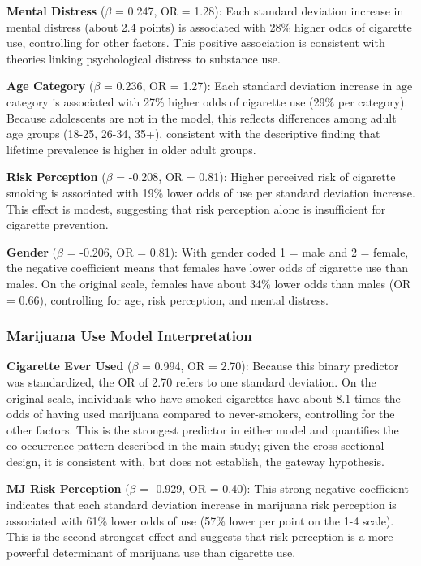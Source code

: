 \documentclass[conference]{IEEEtran}
\begin{document}
\textbf{Mental Distress} ($\beta$ = 0.247, OR = 1.28): Each standard deviation increase in mental distress (about 2.4 points) is associated with 28\% higher odds of cigarette use, controlling for other factors. This positive association is consistent with theories linking psychological distress to substance use.

\textbf{Age Category} ($\beta$ = 0.236, OR = 1.27): Each standard deviation increase in age category is associated with 27\% higher odds of cigarette use (29\% per category). Because adolescents are not in the model, this reflects differences among adult age groups (18-25, 26-34, 35+), consistent with the descriptive finding that lifetime prevalence is higher in older adult groups.

\textbf{Risk Perception} ($\beta$ = -0.208, OR = 0.81): Higher perceived risk of cigarette smoking is associated with 19\% lower odds of use per standard deviation increase. This effect is modest, suggesting that risk perception alone is insufficient for cigarette prevention.

\textbf{Gender} ($\beta$ = -0.206, OR = 0.81): With gender coded 1 = male and 2 = female, the negative coefficient means that females have lower odds of cigarette use than males. On the original scale, females have about 34\% lower odds than males (OR = 0.66), controlling for age, risk perception, and mental distress.

\subsubsection{Marijuana Use Model Interpretation}

\textbf{Cigarette Ever Used} ($\beta$ = 0.994, OR = 2.70): Because this binary predictor was standardized, the OR of 2.70 refers to one standard deviation. On the original scale, individuals who have smoked cigarettes have about 8.1 times the odds of having used marijuana compared to never-smokers, controlling for the other factors. This is the strongest predictor in either model and quantifies the co-occurrence pattern described in the main study; given the cross-sectional design, it is consistent with, but does not establish, the gateway hypothesis.

\textbf{MJ Risk Perception} ($\beta$ = -0.929, OR = 0.40): This strong negative coefficient indicates that each standard deviation increase in marijuana risk perception is associated with 61\% lower odds of use (57\% lower per point on the 1-4 scale). This is the second-strongest effect and suggests that risk perception is a more powerful determinant of marijuana use than cigarette use.
\end{document}
